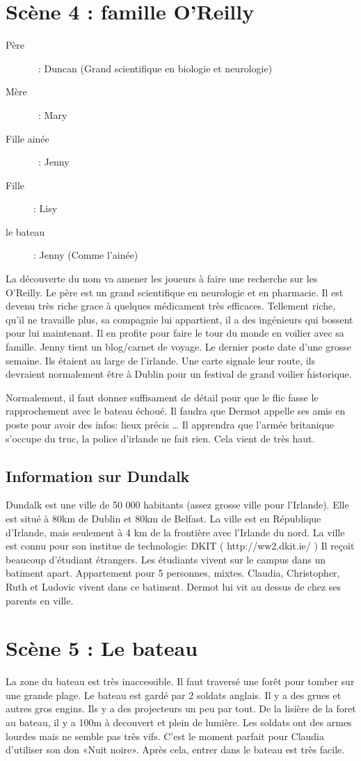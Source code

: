 \documentclass[oneside,12pt]{book}
\begin{document}
\begin{flushleft}
\section{Scène 4 : famille O'Reilly}
\begin{description}
\item[Père] : Duncan (Grand scientifique en biologie et neurologie)
\item[Mère] : Mary
\item[Fille ainée] : Jenny
\item[Fille]: Lisy
\item[le bateau] : Jenny (Comme l'ainée)
\end{description}
La découverte du nom va amener les joueurs à faire une recherche sur les O'Reilly.
Le père est un grand scientifique en neurologie et en pharmacie. Il est devenu très riche grace à quelques médicament très efficaces.
Tellement riche, qu'il ne travaille plus, sa compagnie lui appartient, il a des ingénieurs qui bossent pour lui maintenant. 
Il en profite pour faire le tour du monde en voilier avec sa famille.
Jenny tient un blog/carnet de voyage. Le dernier poste date d'une grosse semaine. Ils étaient au large de l'irlande.
Une carte signale leur route, ils devraient normalement être à Dublin pour un festival de grand voilier ĥistorique. 

Normalement, il faut donner suffisament de détail pour que le flic fasse le rapprochement avec le bateau échoué.
Il faudra que Dermot appelle ses amis en poste pour avoir des infos: lieux précis …
Il apprendra que l'armée britanique s'occupe du truc, la police d'irlande ne fait rien. Cela vient de très haut.

\subsection{Information sur Dundalk}
Dundalk est une ville de 50 000 habitants (assez grosse ville pour l'Irlande). 
Elle est situé à 80km de Dublin et 80km de Belfast.
La ville est en République d'Irlande, mais seulement à 4 km de la frontière avec l'Irlande du nord. 
La ville est connu pour son institue de technologie: DKIT ( http://ww2.dkit.ie/ ) 
Il reçoit beaucoup d'étudiant étrangers. Les étudiants vivent sur le campus dans un batiment apart.
Appartement pour 5 personnes, mixtes. Claudia, Christopher, Ruth et Ludovic vivent dans ce batiment.
Dermot lui vit au dessus de chez ses parents en ville.

\section{Scène 5 : Le bateau}
La zone du bateau est très inaccessible. Il faut traversé une forêt pour tomber sur une grande plage.
Le bateau est gardé par 2 soldats anglais. Il y a des grues et autres gros engins. Ils y a des projecteurs un peu par tout. 
De la lisière de la foret au bateau, il y a 100m à decouvert et plein de lumière. Les soldats ont des armes lourdes mais ne semble pas très vifs.
C'est le moment parfait pour Claudia d'utiliser son don «Nuit noire».
Après cela, entrer dans le bateau est très facile. 


\end{flushleft}
\end{document}
